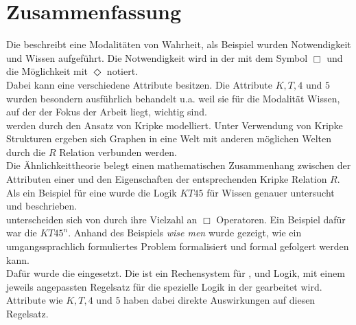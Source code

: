 
\chapter{Zusammenfassung} %
\label{sec:zusammenfassung}

Die \ML beschreibt eine Modalitäten von Wahrheit,
als Beispiel wurden Notwendigkeit und Wissen aufgeführt.
Die Notwendigkeit wird in der \ML mit dem Symbol $\Box$ und die Möglichkeit mit $\Diamond$ notiert.\\
Dabei kann eine \ML verschiedene Attribute besitzen.
Die Attribute $K, T, 4$ und $5$ wurden besondern ausführlich behandelt u.a. weil sie für die Modalität Wissen, auf der der Fokus der Arbeit liegt, wichtig sind.\\
\ML werden durch den \PW Ansatz von Kripke modelliert.
Unter Verwendung von Kripke Strukturen ergeben sich Graphen in eine Welt mit anderen möglichen Welten durch die $R$ Relation verbunden werden.\\
Die Ähnlichkeittheorie belegt einen mathematischen Zusammenhang zwischen der Attributen einer \ML und den Eigenschaften der entsprechenden Kripke Relation $R$.\\
Als ein Beispiel für eine \ML wurde die Logik $KT45$ für Wissen genauer untersucht und beschrieben.\\
\MML unterscheiden sich von \ML durch ihre Vielzahl an $\Box$ Operatoren.
Ein Beispiel dafür war die \MML $KT45^n$.
Anhand des Beispiels \emph{wise men} wurde gezeigt, wie ein umgangssprachlich formuliertes Problem formalisiert und formal gefolgert werden kann.\\
Dafür wurde die \ND eingesetzt.
Die \ND ist ein Rechensystem für \AL, \ML und \MML Logik, mit einem jeweils angepassten Regelsatz für die spezielle Logik in der gearbeitet wird.
Attribute wie $K, T, 4$ und $5$ haben dabei direkte Auswirkungen auf diesen Regelsatz.



